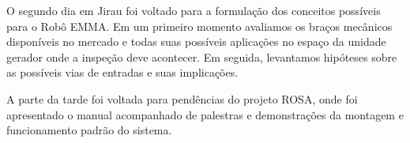 \documentclass{article}
\begin{document}
O segundo dia em Jirau foi voltado para a formulação dos conceitos possíveis
para o Robô EMMA. Em um primeiro momento avaliamos os braços mecânicos
disponíveis no mercado e todas suas possíveis aplicações no espaço da unidade
gerador onde a inspeção deve acontecer. Em seguida, levantamos hipóteses sobre
as possíveis vias de entradas e suas implicações. 

A parte da tarde foi voltada para pendências do projeto ROSA, onde foi
apresentado o manual acompanhado de palestras e demonstrações da montagem e
funcionamento padrão do sistema.
\end{document}
